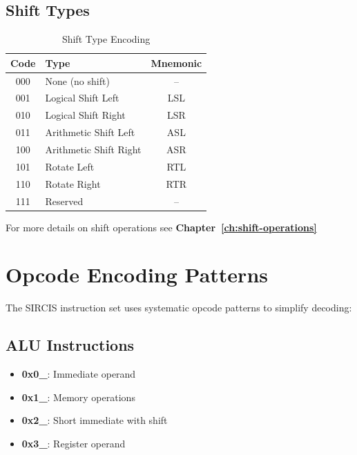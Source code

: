 \subsection{Shift Types}

\begin{table}[H]
	\centering
	\begin{tabular}{clc}
		\toprule
		\textbf{Code} & \textbf{Type}          & \textbf{Mnemonic} \\
		\midrule
		000           & None (no shift)        & --                \\
		001           & Logical Shift Left     & LSL               \\
		010           & Logical Shift Right    & LSR               \\
		011           & Arithmetic Shift Left  & ASL               \\
		100           & Arithmetic Shift Right & ASR               \\
		101           & Rotate Left            & RTL               \\
		110           & Rotate Right           & RTR               \\
		111           & Reserved               & --                \\
		\bottomrule
	\end{tabular}
	\caption{Shift Type Encoding}
	\label{tab:shift-types}
\end{table}

For more details on shift operations see \textbf{Chapter~\ref{ch:shift-operations}}

\section{Opcode Encoding Patterns}

The SIRCIS instruction set uses systematic opcode patterns to simplify decoding:

\subsection{ALU Instructions}

\begin{itemize}
	\item \textbf{0x0\_}: Immediate operand
	\item \textbf{0x1\_}: Memory operations
	\item \textbf{0x2\_}: Short immediate with shift
	\item \textbf{0x3\_}: Register operand
\end{itemize}

